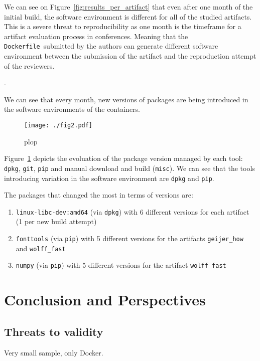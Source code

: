 \documentclass[sigconf,natbib=false]{acmart}
\newcommand{\df}{\texttt{Dockerfile}}
\newcommand{\todo}[1]{{\color{red}{TODO: #1}}}
\begin{document}
We can see on Figure~\ref{fig:results_per_artifact} that even after one month of the initial build, the software environment is different for all of the studied artifacts.
This is a severe threat to reproducibility as one month is the timeframe for a artifact evaluation process in conferences.
Meaning that the \df\ submitted by the authors can generate different software environment between the submission of the artifact and the reproduction attempt of the reviewers.

\todo{a word on from ubuntu:latest and apt-get update}.

We can see that every month, new versions of packages are being introduced in the software environments of the containers.



\begin{figure}
  \centering
  \texttt{[image: ./fig2.pdf]}
  \caption{
    plop
  }\label{fig:results_per_tool}
\end{figure}

Figure~\ref{fig:results_per_tool} depicts the evoluation of the package version managed by each tool: \texttt{dpkg}, \texttt{git}, \texttt{pip} and manual download and build (\texttt{misc}).
We can see that the tools introducing variation in the software environment are \texttt{dpkg} and \texttt{pip}.

The packages that changed the most in terms of versions are:
\begin{enumerate}
\item \texttt{linux-libc-dev:amd64} (via \texttt{dpkg}) with 6 different versions for each artifact (1 per new build attempt)
\item \texttt{fonttools} (via \texttt{pip}) with 5 different versions for the artifacts \texttt{geijer\_how} and \texttt{wolff\_fast}
\item \texttt{numpy} (via \texttt{pip}) with 5 different versions for the artifact \texttt{wolff\_fast}
\end{enumerate}


\section{Conclusion and Perspectives}

\subsection{Threats to validity}
Very small sample, only Docker.
\end{document}
